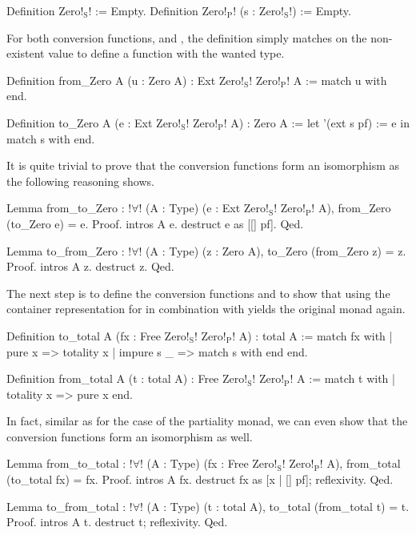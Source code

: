\begin{coqcode}
Definition Zero!$_\text{S}$! := Empty.
Definition Zero!$_\text{P}$! (s : Zero!$_\text{S}$!) := Empty.
\end{coqcode}

For both conversion functions,  and , the definition simply matches on the non\--existent value to define a function with the wanted type.

\begin{coqcode}
Definition from_Zero A (u : Zero A) : Ext Zero!$_\text{S}$! Zero!$_\text{P}$! A :=
  match u with end.

Definition to_Zero A (e : Ext Zero!$_\text{S}$! Zero!$_\text{P}$! A) : Zero A :=
  let '(ext s pf) := e in match s with end.
\end{coqcode}

It is quite trivial to prove that the conversion functions form an isomorphism as the following reasoning shows.

\begin{coqcode}
Lemma from_to_Zero : !$\forall$! (A : Type) (e : Ext Zero!$_\text{S}$! Zero!$_\text{P}$! A),
    from_Zero (to_Zero e) = e.
Proof.
  intros A e. destruct e as [[] pf].
Qed.

Lemma to_from_Zero : !$\forall$! (A : Type) (z : Zero A),
    to_Zero (from_Zero z) = z.
Proof.
  intros A z. destruct z.
Qed.
\end{coqcode}

The next step is to define the conversion functions  and  to show that using the container representation for  in combination with  yields the original monad  again.

\begin{coqcode}
Definition to_total A (fx : Free Zero!$_\text{S}$! Zero!$_\text{P}$! A) : total A :=
  match fx with
  | pure x        => totality x
  | impure s _ => match s with end
  end.

Definition from_total A (t : total A) : Free Zero!$_\text{S}$! Zero!$_\text{P}$! A :=
  match t with
  | totality x => pure x
  end.
\end{coqcode}

\noindent
In fact, similar as for the case of the partiality monad, we can even show that the conversion functions form an isomorphism as well.

\begin{coqcode}
Lemma from_to_total : !$\forall$! (A : Type) (fx : Free Zero!$_\text{S}$! Zero!$_\text{P}$! A),
    from_total (to_total fx) = fx.
Proof.
  intros A fx. destruct fx as [x | [] pf]; reflexivity.
Qed.

Lemma to_from_total : !$\forall$! (A : Type) (t : total A),
    to_total (from_total t) = t.
Proof.
  intros A t. destruct t; reflexivity.
Qed.
\end{coqcode}


